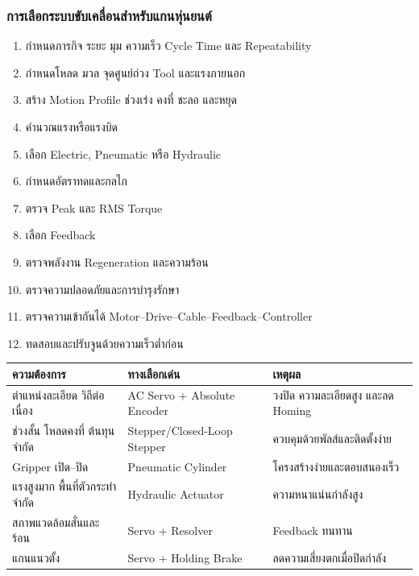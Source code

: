\subsubsection{การเลือกระบบขับเคลื่อนสำหรับแกนหุ่นยนต์}

\begin{enumerate}
    \item กำหนดภารกิจ ระยะ มุม ความเร็ว Cycle Time และ Repeatability
    \item กำหนดโหลด มวล จุดศูนย์ถ่วง Tool และแรงภายนอก
    \item สร้าง Motion Profile ช่วงเร่ง คงที่ ชะลอ และหยุด
    \item คำนวณแรงหรือแรงบิด
    \item เลือก Electric, Pneumatic หรือ Hydraulic
    \item กำหนดอัตราทดและกลไก
    \item ตรวจ Peak และ RMS Torque
    \item เลือก Feedback
    \item ตรวจพลังงาน Regeneration และความร้อน
    \item ตรวจความปลอดภัยและการบำรุงรักษา
    \item ตรวจความเข้ากันได้ Motor–Drive–Cable–Feedback–Controller
    \item ทดสอบและปรับจูนด้วยความเร็วต่ำก่อน
\end{enumerate}

\begin{table}[htbp]
    \centering
    \begin{tabular}{l l l}
        \hline
        \textbf{ความต้องการ} & \textbf{ทางเลือกเด่น} & \textbf{เหตุผล} \\
        \hline
        ตำแหน่งละเอียด วิถีต่อเนื่อง & AC Servo + Absolute Encoder & วงปิด ความละเอียดสูง และลด Homing \\
        ช่วงสั้น โหลดคงที่ ต้นทุนจำกัด & Stepper/Closed-Loop Stepper & ควบคุมด้วยพัลส์และติดตั้งง่าย \\
        Gripper เปิด–ปิด & Pneumatic Cylinder & โครงสร้างง่ายและตอบสนองเร็ว \\
        แรงสูงมาก พื้นที่ตัวกระทำจำกัด & Hydraulic Actuator & ความหนาแน่นกำลังสูง \\
        สภาพแวดล้อมสั่นและร้อน & Servo + Resolver & Feedback ทนทาน \\
        แกนแนวตั้ง & Servo + Holding Brake & ลดความเสี่ยงตกเมื่อปิดกำลัง \\
        \hline
    \end{tabular}
\end{table}

